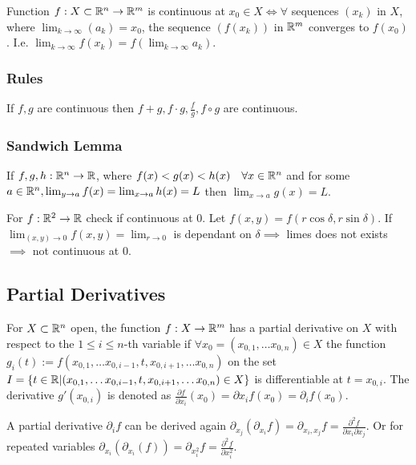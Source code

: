 Function $f: X \subset \mathbb{R}^n \to \mathbb{R}^m$ is continuous at $x_0 \in X \iff \forall$ sequences $(x_k)$ in $X$, where $\lim_{k \to \infty} (a_k) = x_0$, the sequence $(f(x_k))$ in $\mathbb{R}^m$ converges to $f(x_0)$. I.e. $\lim_{k \to \infty} f(x_k) = f(\lim_{k \to \infty} a_k)$.

\subsubsection{Rules}
If $f, g$ are continuous then $f + g, f \cdot g, \frac{f}{g}, f \circ g$ are continuous.

\subsubsection{Sandwich Lemma}
If $f, g, h: \mathbb{R}^n \to \mathbb{R}$, where $f(x) < g(x) < h(x) \quad \forall x \in \mathbb{R}^n$ and for some $a \in \mathbb{R}^n, \lim_{y \to a} f(x) = \lim_{x \to a} h(x) = L$ then $\lim_{x \to a} g(x) = L$.

For $f: \mathbb{R}^2 \to \mathbb{R}$ check if continuous at $0$. Let $f(x, y) = f(r \cos \delta, r \sin \delta)$. If $\lim_{(x, y) \to 0} f(x, y) = \lim_{r \to 0}$ is dependant on $\delta \implies$ limes does not exists $\implies$ not continuous at $0$.

\subsection{Partial Derivatives}
For $X \subset \mathbb{R}^n$ open, the function $f: X \to \mathbb{R}^m$ has a partial derivative on $X$ with respect to the $1 \le i \le n$-th variable if $\forall x_0 = (x_{0,1}, \dots x_{0,n}) \in X$ the function $g_i(t):= f(x_{0,1}, \dots x_{0, i - 1}, t, x_{0, i + 1}, \dots x_{0, n})$ on the set $I = \{t \in \mathbb{R} | (x_{0,1}, \dots x_{0, i - 1}, t, x_{0, i + 1}, \dots x_{0, n}) \in X\}$ is differentiable at $t = x_{0, i}$. The derivative $g'(x_{0,i})$ is denoted as $\frac{\partial f}{\partial x_i} (x_0) = \partial{x_i}f(x_0) = \partial_i f(x_0)$.

\begin{compactitem}
\item A partial derivative $\partial_i f$ can be derived again $\partial_{x_j} (\partial_{x_i} f) = \partial_{x_i, x_j} f = \frac{\partial^2 f}{\partial x_i \partial x_j}$. Or for repeated variables $\partial_{x_i} (\partial_{x_i} (f)) = \partial_{x^2_i} f = \frac{\partial^2 f}{\partial x^2_i}$.
\end{compactitem}

